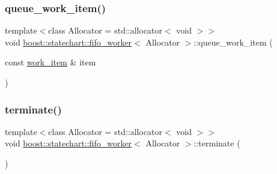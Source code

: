 \subsubsection{\texorpdfstring{queue\+\_\+work\+\_\+item()}{queue\_work\_item()}\hspace{0.1cm}{\footnotesize\ttfamily [2/2]}}
{\footnotesize\ttfamily template$<$class Allocator = std\+::allocator$<$ void $>$$>$ \\
void \mbox{\hyperlink{classboost_1_1statechart_1_1fifo__worker}{boost\+::statechart\+::fifo\+\_\+worker}}$<$ Allocator $>$\+::queue\+\_\+work\+\_\+item (\begin{DoxyParamCaption}\item[{const \mbox{\hyperlink{classboost_1_1statechart_1_1fifo__worker_ac90f6805565bb3e8d65e4cdde96d90c2}{work\+\_\+item}} \&}]{item }\end{DoxyParamCaption})\hspace{0.3cm}{\ttfamily [inline]}}

\mbox{\label{classboost_1_1statechart_1_1fifo__worker_a3010e3b8572e537865bca0158de39a5c}} 
\subsubsection{\texorpdfstring{terminate()}{terminate()}}
{\footnotesize\ttfamily template$<$class Allocator = std\+::allocator$<$ void $>$$>$ \\
void \mbox{\hyperlink{classboost_1_1statechart_1_1fifo__worker}{boost\+::statechart\+::fifo\+\_\+worker}}$<$ Allocator $>$\+::terminate (\begin{DoxyParamCaption}{ }\end{DoxyParamCaption})\hspace{0.3cm}{\ttfamily [inline]}}

\mbox{\label{classboost_1_1statechart_1_1fifo__worker_ab220ce19cda37ceabc0da940109d7d05}} 
